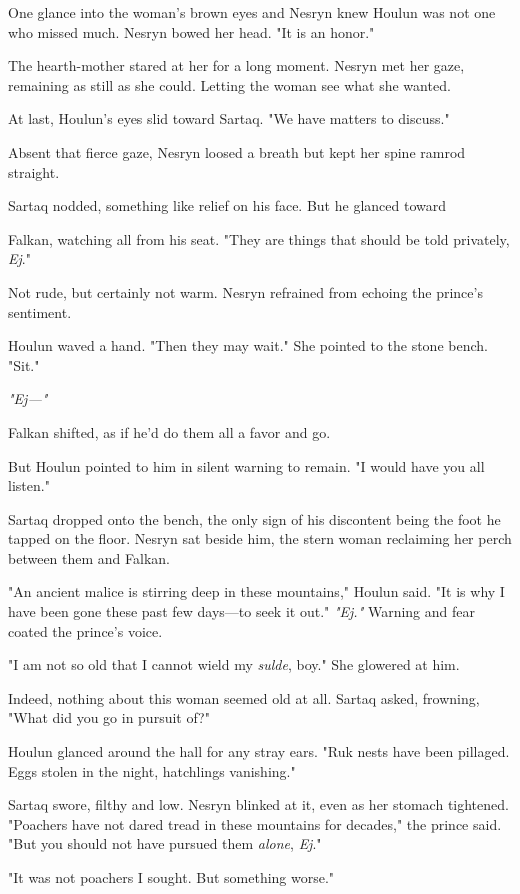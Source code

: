 One glance into the woman's brown eyes and Nesryn knew Houlun was not one who missed much. Nesryn bowed her head. "It is an honor."

The hearth-mother stared at her for a long moment. Nesryn met her gaze, remaining as still as she could. Letting the woman see what she wanted.

At last, Houlun's eyes slid toward Sartaq. "We have matters to discuss."

Absent that fierce gaze, Nesryn loosed a breath but kept her spine ramrod straight.

Sartaq nodded, something like relief on his face. But he glanced toward

Falkan, watching all from his seat. "They are things that should be told privately, \emph{Ej}."

Not rude, but certainly not warm. Nesryn refrained from echoing the prince's sentiment.

Houlun waved a hand. "Then they may wait." She pointed to the stone bench. "Sit."

\emph{"Ej---"}

Falkan shifted, as if he'd do them all a favor and go.

But Houlun pointed to him in silent warning to remain. "I would have you all listen."

Sartaq dropped onto the bench, the only sign of his discontent being the foot he tapped on the floor. Nesryn sat beside him, the stern woman reclaiming her perch between them and Falkan.

"An ancient malice is stirring deep in these mountains," Houlun said. "It is why I have been gone these past few days---to seek it out."
\emph{"Ej."} Warning and fear coated the prince's voice.

"I am not so old that I cannot wield my \emph{sulde}, boy." She glowered at him.

Indeed, nothing about this woman seemed old at all. Sartaq asked, frowning, "What did you go in pursuit of?"

Houlun glanced around the hall for any stray ears. "Ruk nests have been pillaged. Eggs stolen in the night, hatchlings vanishing."

Sartaq swore, filthy and low. Nesryn blinked at it, even as her stomach tightened. "Poachers have not dared tread in these mountains for decades," the prince said. "But you should not have pursued them
\emph{alone}, \emph{Ej}."

"It was not poachers I sought. But something worse."

